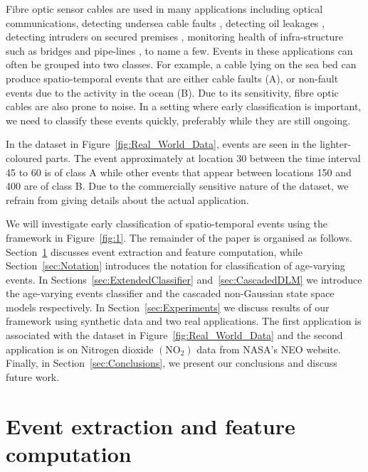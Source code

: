 \documentclass[a4paper,11pt]{article}
\begin{document}
Fibre optic sensor cables are used in many applications including optical communications, detecting undersea cable faults \cite{jiang2009technological}, detecting oil leakages \cite{nikles2004leakage}, detecting intruders on secured premises \cite{griffiths1995developments}, monitoring health of infra-structure such as bridges and pipe-lines \cite{li2004recent}, to name a few. Events in these applications can often be grouped into two classes. For example, a cable lying on the sea bed can produce spatio-temporal events that are either cable faults (A), or non-fault events due to the activity in the ocean (B). Due to its sensitivity, fibre optic cables are also prone to noise. In a setting where early classification is important, we need to classify these events quickly, preferably while they are still ongoing.

In the dataset in Figure~\ref{fig:Real_World_Data}, events are seen in the lighter-coloured parts. The event approximately at location 30 between the time interval 45 to 60 is of class A while other events that appear between locations 150 and 400 are of class B. Due to the commercially sensitive nature of the dataset, we refrain from giving details about the actual application.

We will investigate early classification of spatio-temporal events using the framework in Figure~\ref{fig:1}. The remainder of the paper is organised as follows. Section~\ref{sec:EventExtract} discusses event extraction and feature computation, while Section~\ref{sec:Notation} introduces the notation for classification of age-varying events. In Sections~\ref{sec:ExtendedClassifier} and~\ref{sec:CascadedDLM} we introduce the age-varying events classifier and the cascaded non-Gaussian state space models respectively. %
In Section~\ref{sec:Experiments} we discuss results of our framework using synthetic data and two real applications. The first application is associated with the dataset in Figure~\ref{fig:Real_World_Data} and the second application is on Nitrogen dioxide $(\text{NO}_2)$ data from NASA's NEO \cite{OMINO2} website. Finally, in Section~\ref{sec:Conclusions}, we present our conclusions and discuss future work.

\section{Event extraction and feature computation} \label{sec:EventExtract}
\end{document}
